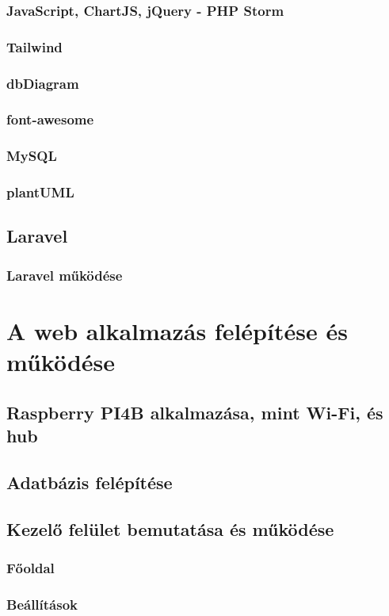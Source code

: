 \documentclass[
]{thesis-ekf}
\theoremstyle{definition}
\theoremstyle{remark}
\begin{document}
	\subsection{JavaScript, ChartJS, jQuery - PHP Storm}
	\subsection{Tailwind}
	\subsection{dbDiagram}
	\subsection{font-awesome}
	\subsection{MySQL}
	\subsection{plantUML}
	\section{Laravel}
	\subsection{Laravel működése}
	
	\chapter{A web alkalmazás felépítése és működése}
	\section{Raspberry PI4B alkalmazása, mint Wi-Fi, és hub}
	\section{Adatbázis felépítése}
	\section{Kezelő felület bemutatása és működése}
	\subsection{Főoldal}
	\subsection{Beállítások}
\end{document}
